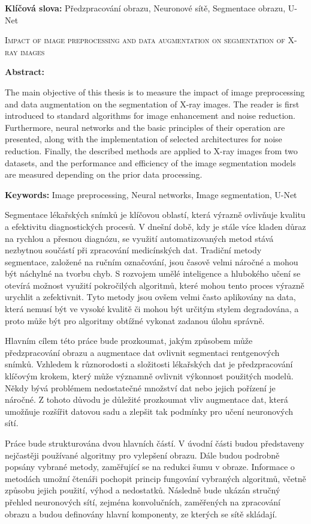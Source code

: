 \documentclass[male,czech,api_ing]{thesis}
\newcommand{\nazeven}{Impact of image preprocessing and data augmentation on segmentation of X-ray images}     %
\begin{document}
\textbf{Klíčová slova:} Předzpracování obrazu, Neuronové sítě, Segmentace obrazu, U-Net

\bigskip


\textsc{\nazeven}

\textbf{Abstract:}

The main objective of this thesis is to measure the impact of image preprocessing and data augmentation on the segmentation of X-ray images. The reader is first introduced to standard algorithms for image enhancement and noise reduction. Furthermore, neural networks and the basic principles of their operation are presented, along with the implementation of selected architectures for noise reduction. Finally, the described methods are applied to X-ray images from two datasets, and the performance and efficiency of the image segmentation models are measured depending on the prior data processing.

\textbf{Keywords:} Image preprocessing, Neural networks, Image segmentation, U-Net

\tableofcontents

Segmentace lékařských snímků je klíčovou oblastí, která výrazně ovlivňuje kvalitu a efektivitu diagnostických procesů. V dnešní době, kdy je stále více kladen důraz na rychlou a přesnou diagnózu, se využití automatizovaných metod stává nezbytnou součástí při zpracování medicínských dat. Tradiční metody segmentace, založené na ručním označování, jsou časově velmi náročné a mohou být náchylné na tvorbu chyb. S rozvojem umělé inteligence a hlubokého učení se otevírá možnost využití pokročilých algoritmů, které mohou tento proces výrazně urychlit a zefektivnit. Tyto metody jsou ovšem velmi často aplikovány na data, která nemusí být ve vysoké kvalitě či mohou být určitým stylem degradována, a proto může být pro algoritmy obtížné vykonat zadanou úlohu správně.

Hlavním cílem této práce bude prozkoumat, jakým způsobem může předzpracování obrazu a augmentace dat ovlivnit segmentaci rentgenových snímků. Vzhledem k různorodosti a složitosti lékařských dat je předzpracování klíčovým krokem, který může významně ovlivnit výkonnost použitých modelů. Někdy bývá problémem nedostatečné množství dat nebo jejich pořízení je náročné. Z tohoto důvodu je důležité prozkoumat vliv augmentace dat, která umožňuje rozšířit datovou sadu a zlepšit tak podmínky pro učení neuronových sítí.

Práce bude strukturována dvou hlavních částí. V úvodní části budou představeny nejčastěji používané algoritmy pro vylepšení obrazu. Dále budou podrobně popsány vybrané metody, zaměřující se na redukci šumu v obraze. Informace o metodách umožní čtenáři pochopit princip fungování vybraných algoritmů, včetně způsobu jejich použití, výhod a nedostatků. Následně bude ukázán stručný přehled neuronových sítí, zejména konvolučních, zaměřených na zpracování obrazu a budou definovány hlavní komponenty, ze kterých se sítě skládají.
\end{document}
